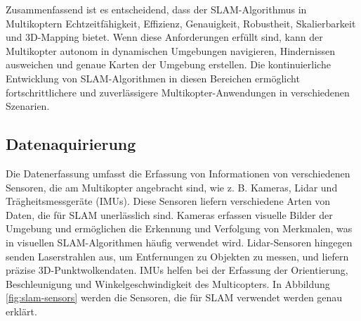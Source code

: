 Zusammenfassend ist es entscheidend, dass der SLAM-Algorithmus in Multikoptern Echtzeitfähigkeit, Effizienz, Genauigkeit, Robustheit, Skalierbarkeit und 3D-Mapping bietet. Wenn diese Anforderungen erfüllt sind, kann der Multikopter autonom in dynamischen Umgebungen navigieren, Hindernissen ausweichen und genaue Karten der Umgebung erstellen. Die kontinuierliche Entwicklung von SLAM-Algorithmen in diesen Bereichen ermöglicht fortschrittlichere und zuverlässigere Multikopter-Anwendungen in verschiedenen Szenarien.

\subsection{Datenaquirierung}

Die Datenerfassung umfasst die Erfassung von Informationen von verschiedenen Sensoren, die am Multikopter angebracht sind, wie z. B. Kameras, Lidar und Trägheitsmessgeräte (IMUs). Diese Sensoren liefern verschiedene Arten von Daten, die für \ac{SLAM} unerlässlich sind. Kameras erfassen visuelle Bilder der Umgebung und ermöglichen die Erkennung und Verfolgung von Merkmalen, was in visuellen \ac{SLAM}-Algorithmen häufig verwendet wird. Lidar-Sensoren hingegen senden Laserstrahlen aus, um Entfernungen zu Objekten zu messen, und liefern präzise 3D-Punktwolkendaten. \ac{IMU}s helfen bei der Erfassung der Orientierung, Beschleunigung und Winkelgeschwindigkeit des Multicopters.
In Abbildung \ref{fig:slam-sensors} werden die Sensoren, die für \ac{SLAM} verwendet werden genau erklärt.

